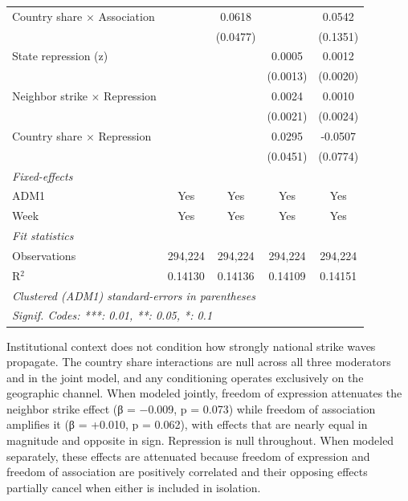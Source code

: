 \documentclass[
  11pt,
]{article}
\begin{document}
\begin{table}
\begin{tabular}{lcccc}
   Country share $\times$ Association    &                & 0.0618          &                & 0.0542\\   
                                         &                & (0.0477)        &                & (0.1351)\\   
   State repression (z)                  &                &                 & 0.0005         & 0.0012\\   
                                         &                &                 & (0.0013)       & (0.0020)\\   
   Neighbor strike $\times$ Repression   &                &                 & 0.0024         & 0.0010\\   
                                         &                &                 & (0.0021)       & (0.0024)\\   
   Country share $\times$ Repression     &                &                 & 0.0295         & -0.0507\\   
                                         &                &                 & (0.0451)       & (0.0774)\\   
   \midrule
   \emph{Fixed-effects}\\
   ADM1                                  & Yes            & Yes             & Yes            & Yes\\  
   Week                                  & Yes            & Yes             & Yes            & Yes\\  
   \midrule
   \emph{Fit statistics}\\
   Observations                          & 294,224        & 294,224         & 294,224        & 294,224\\  
   R$^2$                                 & 0.14130        & 0.14136         & 0.14109        & 0.14151\\  
   \hline
   \multicolumn{5}{l}{\emph{Clustered (ADM1) standard-errors in parentheses}}\\
   \multicolumn{5}{l}{\emph{Signif. Codes: ***: 0.01, **: 0.05, *: 0.1}}\\
\end{tabular}
\end{table}

\par\endgroup

Institutional context does not condition how strongly national strike
waves propagate. The country share interactions are null across all
three moderators and in the joint model, and any conditioning operates
exclusively on the geographic channel. When modeled jointly, freedom of
expression attenuates the neighbor strike effect (β = −0.009, p = 0.073)
while freedom of association amplifies it (β = +0.010, p = 0.062), with
effects that are nearly equal in magnitude and opposite in sign.
Repression is null throughout. When modeled separately, these effects
are attenuated because freedom of expression and freedom of association
are positively correlated and their opposing effects partially cancel
when either is included in isolation.
\end{document}
